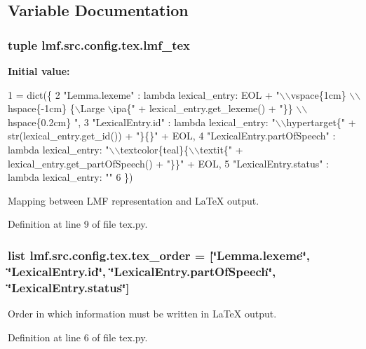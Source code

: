 \subsection{Variable Documentation}
\hypertarget{namespacelmf_1_1src_1_1config_1_1tex_aee96ffe8f8f1e7f54b1c9fa55d93010d}{
\subsubsection[{lmf\+\_\+tex}]{\setlength{\rightskip}{0pt plus 5cm}tuple lmf.\+src.\+config.\+tex.\+lmf\+\_\+tex}}\label{namespacelmf_1_1src_1_1config_1_1tex_aee96ffe8f8f1e7f54b1c9fa55d93010d}
{\bfseries Initial value\+:}
\begin{DoxyCode}
1 = dict(\{
2     \textcolor{stringliteral}{"Lemma.lexeme"} : \textcolor{keyword}{lambda} lexical\_entry: EOL + \textcolor{stringliteral}{"\(\backslash\)\(\backslash\)vspace\{1cm\} \(\backslash\)\(\backslash\)hspace\{-1cm\} \{\(\backslash\)Large \(\backslash\)ipa\{"} + 
      lexical\_entry.get\_lexeme() + \textcolor{stringliteral}{"\}\} \(\backslash\)\(\backslash\)hspace\{0.2cm\} "},
3     \textcolor{stringliteral}{"LexicalEntry.id"} : \textcolor{keyword}{lambda} lexical\_entry: \textcolor{stringliteral}{"\(\backslash\)\(\backslash\)hypertarget\{"} + str(lexical\_entry.get\_id()) + \textcolor{stringliteral}{"\}\{\}"} + EOL,
4     \textcolor{stringliteral}{"LexicalEntry.partOfSpeech"} : \textcolor{keyword}{lambda} lexical\_entry: \textcolor{stringliteral}{"\(\backslash\)\(\backslash\)textcolor\{teal\}\{\(\backslash\)\(\backslash\)textit\{"} + 
      lexical\_entry.get\_partOfSpeech() + \textcolor{stringliteral}{"\}\}"} + EOL,
5     \textcolor{stringliteral}{"LexicalEntry.status"} : \textcolor{keyword}{lambda} lexical\_entry: \textcolor{stringliteral}{""}
6 \})
\end{DoxyCode}


Mapping between L\+M\+F representation and La\+Te\+X output. 



Definition at line 9 of file tex.\+py.

\hypertarget{namespacelmf_1_1src_1_1config_1_1tex_a19c5578c65b152e179d23ea103849590}{
\subsubsection[{tex\+\_\+order}]{\setlength{\rightskip}{0pt plus 5cm}list lmf.\+src.\+config.\+tex.\+tex\+\_\+order = \mbox{[}\char`\"{}Lemma.\+lexeme\char`\"{}, \char`\"{}Lexical\+Entry.\+id\char`\"{}, \char`\"{}Lexical\+Entry.\+part\+Of\+Speech\char`\"{}, \char`\"{}Lexical\+Entry.\+status\char`\"{}\mbox{]}}}\label{namespacelmf_1_1src_1_1config_1_1tex_a19c5578c65b152e179d23ea103849590}


Order in which information must be written in La\+Te\+X output. 



Definition at line 6 of file tex.\+py.

